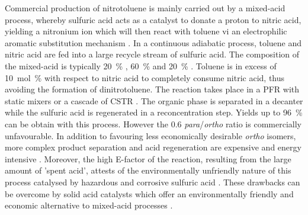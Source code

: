 Commercial production of nitrotoluene is mainly carried out by a mixed-acid process, whereby sulfuric acid acts as a catalyst to donate a proton to nitric acid, yielding a nitronium ion which will then react with toluene vi an electrophilic aromatic substitution mechanism \cite{halder_nitration_2007}. In a continuous adiabatic process, toluene and nitric acid are fed into a large recycle stream of sulfuric acid. The composition of the mixed-acid is typically \SI{20}{\percent} , \SI{60}{\percent}  and \SI{20}{\percent}  \cite{pande_nitration_2010}. Toluene is in excess of \SI{10}{mol\percent} with respect to nitric acid to completely consume nitric acid, thus avoiding the formation of dinitrotoluene. The reaction takes place in a PFR with static mixers or a cascade of CSTR \cite{dugal_nitrobenzene_2005}. The organic phase is separated in a decanter while the sulfuric acid is regenerated in a reconcentration step. Yields up to \SI{96}{\percent} can be obtain with this process. However the 0.6 \textit{para}/\textit{ortho} ratio is commercially unfavourable. In addition to favouring less economically desirable \textit{ortho} isomers, more complex product separation and acid regeneration are expensive and energy intensive \cite{sreedhar_scientific_2013}. 
Moreover, the high E-factor of the reaction, resulting from the large amount of 'spent acid', attests of the environmentally unfriendly nature of this process catalysed by hazardous and corrosive sulfuric acid \cite{pande_nitration_2010}. These drawbacks can be overcome by solid acid catalysts which offer an environmentally friendly and economic alternative to mixed-acid processes \cite{vassena_selective_1999}.


